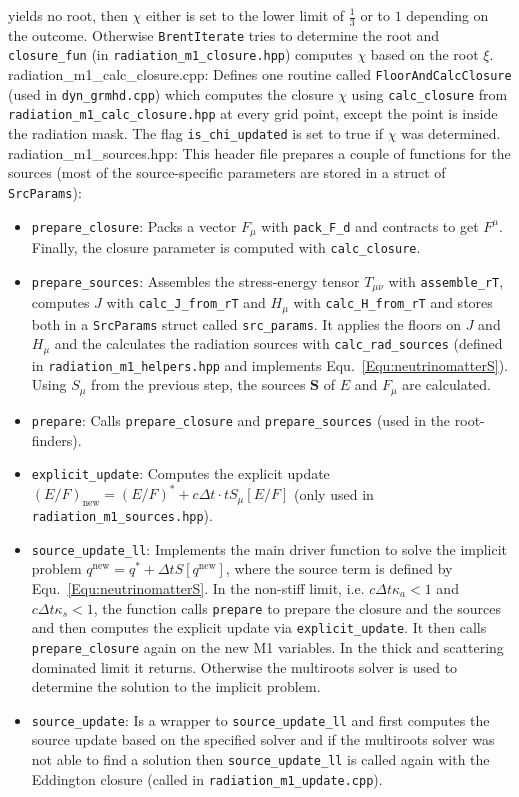 \documentclass{article}
\newcommand{\var}[1]{%
  {\setlength{\fboxsep}{1.5pt}%
   \colorbox{varbg}{\textcolor{varfg}{\texttt{\small #1}}}}}
\begin{document}
yields no root, then $\chi$ either is set to the lower limit of $\frac{1}{3}$ or to $1$ depending on the outcome. Otherwise \var{BrentIterate} tries to determine the root and \var{closure\_fun} (in \var{radiation\_m1\_closure.hpp})
computes $\chi$ based on the root $\xi$.\\
{\color{gray}radiation\_m1\_calc\_closure.cpp:} Defines one routine called \var{FloorAndCalcClosure} (used in \var{dyn\_grmhd.cpp}) which computes the closure $\chi$ using \var{calc\_closure} from \var{radiation\_m1\_calc\_closure.hpp} at every grid point,
except the point is inside the radiation mask. The flag \var{is\_chi\_updated} is set to true if $\chi$ was determined.\\
{\color{gray}radiation\_m1\_sources.hpp:} This header file prepares a couple of functions for the sources (most of the source-specific parameters are stored in a struct of \var{SrcParams}):
\begin{itemize}
  \item \var{prepare\_closure}: Packs a vector $F_{\mu}$ with \var{pack\_F\_d} and contracts to get $F^{\mu}$. Finally, the closure parameter is computed with \var{calc\_closure}.
  \item \var{prepare\_sources}: Assembles the stress-energy tensor $T_{\mu\nu}$ with \var{assemble\_rT}, computes $J$ with \var{calc\_J\_from\_rT} and $H_{\mu}$ with
  \var{calc\_H\_from\_rT} and stores both in a \var{SrcParams} struct called \var{src\_params}. It applies the floors on $J$ and $H_{\mu}$ and the calculates the radiation sources with
  \var{calc\_rad\_sources} (defined in \var{radiation\_m1\_helpers.hpp} and implements Equ.~\eqref{Equ:neutrinomatterS}). Using $S_{\mu}$ from the previous step, the sources $\mathbf{S}$ of $E$ and $F_{\mu}$ are calculated.
  \item \var{prepare}: Calls \var{prepare\_closure} and \var{prepare\_sources} (used in the root-finders).
  \item \var{explicit\_update}: Computes the explicit update $(E/F)_{\mathrm{new}}=(E/F)^*+c\Delta t\cdot tS_{\mu}[E/F]$ (only used in \var{radiation\_m1\_sources.hpp}).
  \item \var{source\_update\_ll}: Implements the main driver function to solve the implicit problem $q^{\mathrm{new}}=q^*+\Delta tS[q^{\mathrm{new}}]$, where the source term is defined by Equ.~\eqref{Equ:neutrinomatterS}.
  In the non-stiff limit, i.e. $c\Delta t\kappa_a<1$ and $c\Delta t \kappa_s<1$, the function calls \var{prepare} to prepare the closure and the sources and then computes the explicit update via
  \var{explicit\_update}. It then calls \var{prepare\_closure} again on the new M1 variables. In the thick and scattering dominated limit it returns. Otherwise the multiroots solver is used to determine the solution to the
  implicit problem.
  \item \var{source\_update}: Is a wrapper to \var{source\_update\_ll} and first computes the source update based on the specified solver and if the multiroots solver was not
  able to find a solution then \var{source\_update\_ll} is called again with the Eddington closure (called in \var{radiation\_m1\_update.cpp}).
\end{itemize}
\end{document}
